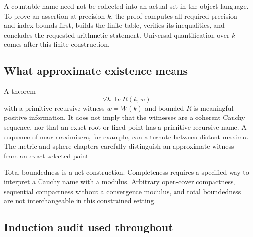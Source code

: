 A countable name need not be collected into an actual set in the object language. To prove an assertion at precision $k$, the proof computes all required precision and index bounds first, builds the finite table, verifies its inequalities, and concludes the requested arithmetic statement. Universal quantification over $k$ comes after this finite construction.

\subsection{What approximate existence means}

A theorem
\[
 \forall k\ \exists w\ R(k,w)
\]
with a primitive recursive witness $w=W(k)$ and bounded $R$ is meaningful positive information. It does not imply that the witnesses are a coherent Cauchy sequence, nor that an exact root or fixed point has a primitive recursive name. A sequence of near-maximizers, for example, can alternate between distant maxima. The metric and sphere chapters carefully distinguish an approximate witness from an exact selected point.

Total boundedness is a net construction. Completeness requires a specified way to interpret a Cauchy name with a modulus. Arbitrary open-cover compactness, sequential compactness without a convergence modulus, and total boundedness are not interchangeable in this constrained setting.

\subsection{Induction audit used throughout}

